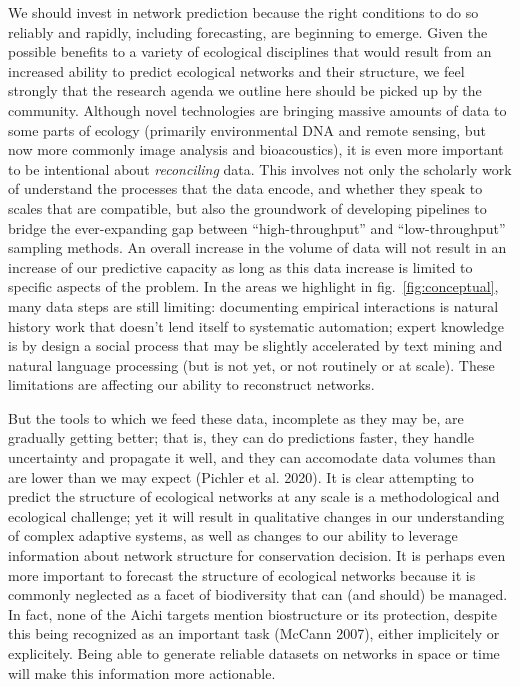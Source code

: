 \documentclass[11pt]{article}
\begin{document}
We should invest in network prediction because the right conditions to
do so reliably and rapidly, including forecasting, are beginning to
emerge. Given the possible benefits to a variety of ecological
disciplines that would result from an increased ability to predict
ecological networks and their structure, we feel strongly that the
research agenda we outline here should be picked up by the community.
Although novel technologies are bringing massive amounts of data to some
parts of ecology (primarily environmental DNA and remote sensing, but
now more commonly image analysis and bioacoustics), it is even more
important to be intentional about \emph{reconciling} data. This involves
not only the scholarly work of understand the processes that the data
encode, and whether they speak to scales that are compatible, but also
the groundwork of developing pipelines to bridge the ever-expanding gap
between ``high-throughput'' and ``low-throughput'' sampling methods. An
overall increase in the volume of data will not result in an increase of
our predictive capacity as long as this data increase is limited to
specific aspects of the problem. In the areas we highlight in
fig.~\ref{fig:conceptual}, many data steps are still limiting:
documenting empirical interactions is natural history work that doesn't
lend itself to systematic automation; expert knowledge is by design a
social process that may be slightly accelerated by text mining and
natural language processing (but is not yet, or not routinely or at
scale). These limitations are affecting our ability to reconstruct
networks.

But the tools to which we feed these data, incomplete as they may be,
are gradually getting better; that is, they can do predictions faster,
they handle uncertainty and propagate it well, and they can accomodate
data volumes than are lower than we may expect (Pichler et al. 2020). It
is clear attempting to predict the structure of ecological networks at
any scale is a methodological and ecological challenge; yet it will
result in qualitative changes in our understanding of complex adaptive
systems, as well as changes to our ability to leverage information about
network structure for conservation decision. It is perhaps even more
important to forecast the structure of ecological networks because it is
commonly neglected as a facet of biodiversity that can (and should) be
managed. In fact, none of the Aichi targets mention biostructure or its
protection, despite this being recognized as an important task (McCann
2007), either implicitely or explicitely. Being able to generate
reliable datasets on networks in space or time will make this
information more actionable.
\end{document}
